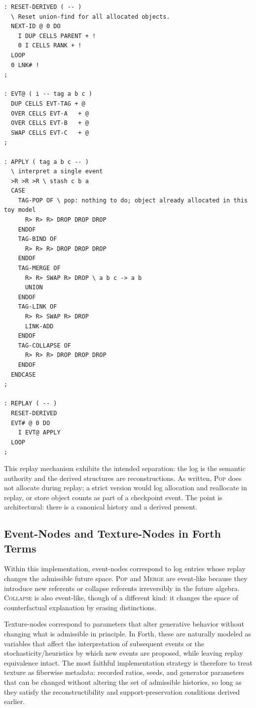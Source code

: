 \documentclass[11pt]{article}
\begin{document}
\begin{verbatim}
: RESET-DERIVED ( -- )
  \ Reset union-find for all allocated objects.
  NEXT-ID @ 0 DO
    I DUP CELLS PARENT + !
    0 I CELLS RANK + !
  LOOP
  0 LNK# !
;

: EVT@ ( i -- tag a b c )
  DUP CELLS EVT-TAG + @
  OVER CELLS EVT-A   + @
  OVER CELLS EVT-B   + @
  SWAP CELLS EVT-C   + @
;

: APPLY ( tag a b c -- )
  \ interpret a single event
  >R >R >R \ stash c b a
  CASE
    TAG-POP OF \ pop: nothing to do; object already allocated in this toy model
      R> R> R> DROP DROP DROP
    ENDOF
    TAG-BIND OF
      R> R> R> DROP DROP DROP
    ENDOF
    TAG-MERGE OF
      R> R> SWAP R> DROP \ a b c -> a b
      UNION
    ENDOF
    TAG-LINK OF
      R> R> SWAP R> DROP
      LINK-ADD
    ENDOF
    TAG-COLLAPSE OF
      R> R> R> DROP DROP DROP
    ENDOF
  ENDCASE
;

: REPLAY ( -- )
  RESET-DERIVED
  EVT# @ 0 DO
    I EVT@ APPLY
  LOOP
;
\end{verbatim}

This replay mechanism exhibits the intended separation: the log is the semantic
authority and the derived structures are reconstructions. As written, \textsc{Pop}
does not allocate during replay; a strict version would log allocation and
reallocate in replay, or store object counts as part of a checkpoint event. The
point is architectural: there is a canonical history and a derived present.

\subsection{Event-Nodes and Texture-Nodes in Forth Terms}

Within this implementation, event-nodes correspond to log entries whose replay
changes the admissible future space. \textsc{Pop} and \textsc{Merge} are event-like
because they introduce new referents or collapse referents irreversibly in the
future algebra. \textsc{Collapse} is also event-like, though of a different kind:
it changes the space of counterfactual explanation by erasing distinctions.

Texture-nodes correspond to parameters that alter generative behavior without
changing what is admissible in principle. In Forth, these are naturally modeled
as variables that affect the interpretation of subsequent events or the
stochasticity/heuristics by which new events are proposed, while leaving replay
equivalence intact. The most faithful implementation strategy is therefore to
treat texture as fiberwise metadata: recorded ratios, seeds, and generator
parameters that can be changed without altering the set of admissible histories,
so long as they satisfy the reconstructibility and support-preservation
conditions derived earlier.
\end{document}
